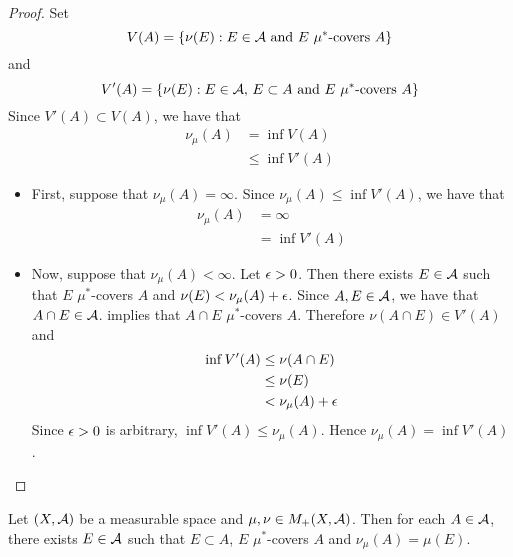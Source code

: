 \documentclass{book}
\begin{document}
	\begin{proof}
		Set 
		$$V(A) = \{\nu(E): E \in \mathcal{A} \text{ and $E$ $\mu^*$-covers $A$} \}$$ and 
		$$V'(A) = \{\text{$\nu(E): E \in \mathcal{A}$, $E \subset A$ and $E$ $\mu^*$-covers $A$} \}$$ 
		Since $V'(A) \subset V(A)$, we have that
		\begin{align*}
			\nu_{\mu}(A) 
			& = \inf V(A) \\
			& \leq \inf V'(A) 
		\end{align*}
		\begin{itemize}
			\item First, suppose that $\nu_{\mu}(A) = \infty$. Since $\nu_{\mu}(A) \leq \inf V'(A) $, we have that
			\begin{align*}
				\nu_{\mu}(A) 
				& = \infty \\
				& = \inf V'(A) 
			\end{align*} 
			\item Now, suppose that $\nu_{\mu}(A) < \infty$. Let $\epsilon >0$. Then there exists $E \in \mathcal{A}$ such that $E$ $\mu^*$-covers $A$ and $\nu(E) < \nu_{\mu}(A) + \epsilon$. Since $A, E \in \mathcal{A}$, we have that $A \cap E \in \mathcal{A}$.  implies that $A \cap E$ $\mu^*$-covers $A$. Therefore $\nu(A \cap E) \in V'(A)$ and
			\begin{align*}
				\inf V'(A)
				& \leq \nu(A \cap E) \\
				& \leq \nu(E) \\
				& < \nu_{\mu}(A) + \epsilon 
			\end{align*}
			Since $\epsilon > 0$ is arbitrary, $\inf V'(A) \leq \nu_{\mu}(A)$. Hence $\nu_{\mu}(A) = \inf V'(A)$.
		\end{itemize}
	\end{proof}

	\begin{ex} 
		Let $(X, \mathcal{A})$ be a measurable space and $\mu, \nu \in M_+(X, \mathcal{A})$. Then for each $A \in \mathcal{A}$, there exists $E \in \mathcal{A}$ such that $E \subset A$, $E$ $\mu^*$-covers $A$ and $\nu_{\mu}(A) = \mu(E)$. 
	\end{ex}
	
\end{document}
